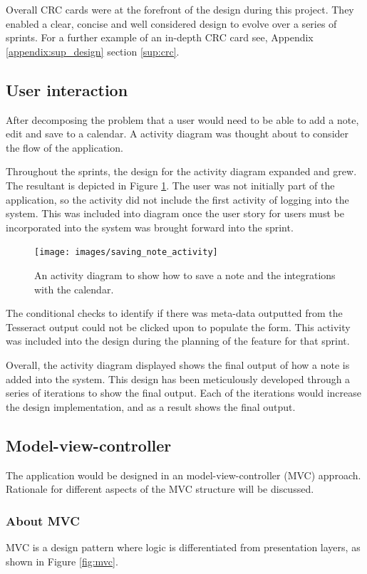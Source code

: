 Overall CRC cards were at the forefront of the design during this project. They enabled a clear, concise and well considered design to evolve over a series of sprints. For a further example of an in-depth CRC card see, Appendix \ref{appendix:sup_design} section \ref{sup:crc}.

\subsection{User interaction}
After decomposing the problem that a user would need to be able to add a note, edit and save to a calendar. A activity diagram was thought about to consider the flow of the application.

Throughout the sprints, the design for the activity diagram expanded and grew. The resultant is depicted in Figure \ref{fig:activity_show_note}. The user was not initially part of the application, so the activity did not include the first activity of logging into the system. This was included into diagram once the user story for users must be incorporated into the system was brought forward into the sprint.

\begin{figure}[H]
  \centering
  \texttt{[image: images/saving\_note\_activity]}
  \caption{An activity diagram to show how to save a note and the integrations with the calendar.}
  \label{fig:activity_show_note}
\end{figure}

The conditional checks to identify if there was meta-data outputted from the Tesseract output could not be clicked upon to populate the form. This activity was included into the design during the planning of the feature for that sprint.

Overall, the activity diagram displayed shows the final output of how a note is added into the system. This design has been meticulously developed through a series of iterations to show the final output. Each of the iterations would increase the design implementation, and as a result shows the final output.

\subsection{Model-view-controller}
The application would be designed in an model-view-controller (MVC) approach. Rationale for different aspects of the MVC structure will be discussed.

\subsubsection{About MVC}
MVC is a design pattern where logic is differentiated from presentation layers, as shown in Figure \ref{fig:mvc}.

